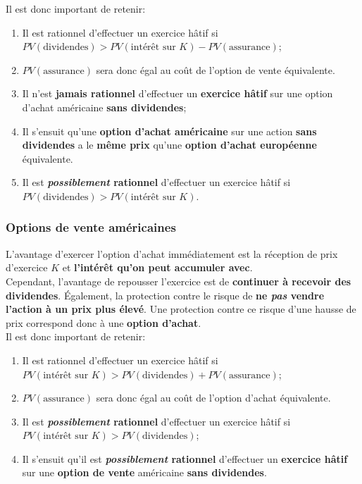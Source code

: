 \documentclass[10pt, french]{article}
\begin{document}
\begin{multicols*}{2}
Il est donc important de retenir:
\begin{conceptgen}{}
\begin{enumerate}[label	=	\circled{\arabic*}{lightgray}]
	\item	Il est rationnel d'effectuer un exercice hâtif si\\
	 $PV(\text{dividendes}) > PV(\text{intérêt sur $K$}) - PV(\text{assurance})$;
 	\item[]	$PV(\text{assurance})$ sera donc égal au coût de l'option de vente équivalente.
	\item	Il n'est \textbf{jamais rationnel} d'effectuer un \textbf{exercice hâtif} sur une option d'achat américaine \textbf{sans dividendes};
	\item[]	Il s'ensuit qu'une \textbf{option d'achat américaine} sur une action \textbf{sans dividendes} a le \textbf{même prix} qu'une \textbf{option d'achat européenne} équivalente.
	\item	Il est \textbf{\textit{possiblement} rationnel} d'effectuer un exercice hâtif si \\
	$PV(\text{dividendes}) > PV(\text{intérêt sur $K$})$.
\end{enumerate}
\end{conceptgen}


\subsubsection*{Options de vente américaines}
L'avantage d'exercer l'option d'achat immédiatement est la réception de prix d'exercice $K$ et \textbf{l'intérêt qu'on peut accumuler avec}.\\

Cependant, l'avantage de repousser l'exercice est de \textbf{continuer à recevoir des dividendes}. Également, la protection contre le risque de \textbf{ne \textit{pas} vendre l'action à un prix plus élevé}. Une protection contre ce risque d'une hausse de prix correspond donc à une \textbf{option d'achat}.\\

Il est donc important de retenir:
\begin{conceptgen}{}
\begin{enumerate}[label	=	\circled{\arabic*}{lightgray}]
	\item	Il est rationnel d'effectuer un exercice hâtif si\\
	 $PV(\text{intérêt sur $K$}) > PV(\text{dividendes}) + PV(\text{assurance})$;
 	\item[]	$PV(\text{assurance})$ sera donc égal au coût de l'option d'achat équivalente.
	\item	Il est \textbf{\textit{possiblement} rationnel} d'effectuer un exercice hâtif si \\
	$PV(\text{intérêt sur $K$}) > PV(\text{dividendes})$;
	\item	Il s'ensuit qu'il est \textbf{\textit{possiblement} rationnel} d'effectuer un \textbf{exercice hâtif} sur une \textbf{option de vente} américaine \textbf{sans dividendes}.
\end{enumerate}
\end{conceptgen}



\end{multicols*}
\end{document}
